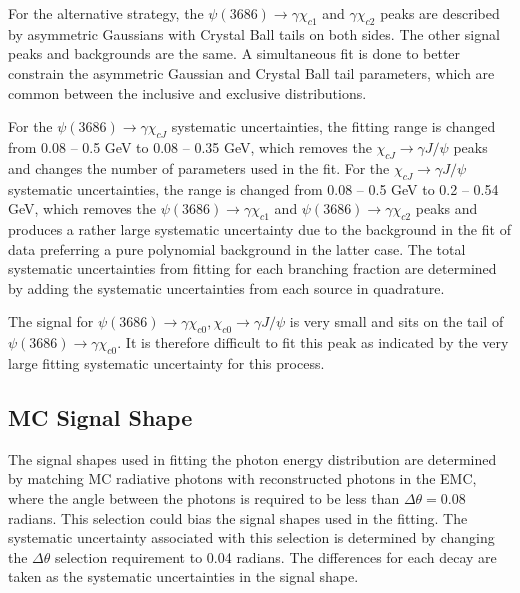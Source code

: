 \documentclass[aps,prd,twocolumn,showpacs,floatfix,byrevtex]{revtex4-1}
\begin{document}
For the alternative strategy, the $\psi(3686) \to \gamma \chi_{c1}$ and
$\gamma \chi_{c2}$ peaks are described by asymmetric Gaussians with
Crystal Ball tails on both sides.  The other signal peaks and
backgrounds are the same.  A simultaneous fit is done to better
constrain the asymmetric Gaussian and Crystal Ball tail parameters,
which are common between the inclusive and exclusive distributions.


For the $\psi(3686) \to \gamma \chi_{cJ}$ systematic uncertainties,
the fitting range is changed from 0.08 -- 0.5 GeV to 0.08 -- 0.35 GeV,
which removes the $\chi_{cJ} \to \gamma J/\psi$ peaks and changes the
number of parameters used in the fit.  For the $\chi_{cJ} \to \gamma
J/\psi$ systematic uncertainties, the range is changed from 0.08 -- 0.5
GeV to 0.2 -- 0.54 GeV, which removes the $\psi(3686) \to \gamma
\chi_{c1}$ and $\psi(3686) \to \gamma \chi_{c2}$ peaks and produces a
rather large systematic uncertainty due to the background in the fit
of data preferring a pure polynomial background in the latter case.
The total systematic uncertainties from fitting for each branching
fraction are determined by adding the systematic uncertainties from
each source in quadrature.


The signal for $\psi(3686) \to \gamma \chi_{c0}, \chi_{c0} \to \gamma
J/\psi$ is very small and sits on the tail of $\psi(3686) \to \gamma
\chi_{c0}$.  It is therefore difficult to fit this peak as indicated
by the very large fitting systematic uncertainty for this process.

\subsection{MC Signal Shape}

The signal shapes used in fitting the photon energy distribution are
determined by matching MC radiative photons with reconstructed photons
in the EMC, where the angle between the photons is required to be less
than $\Delta \theta = 0.08$ radians.  This selection could bias the
signal shapes used in the fitting.  The systematic uncertainty
associated with this selection is determined by changing the $\Delta
\theta$ selection requirement to 0.04 radians.  The differences for
each decay are taken as the systematic uncertainties in the signal
shape.
\end{document}
